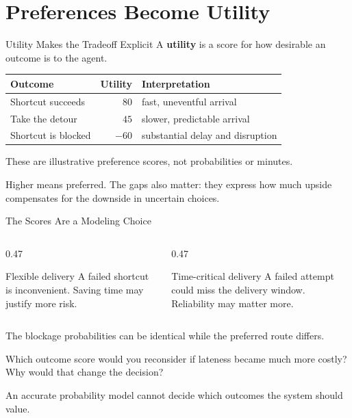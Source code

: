 \documentclass[aspectratio=169,10pt]{beamer}
\begin{document}
\section{Preferences Become Utility}

\begin{frame}{Utility Makes the Tradeoff Explicit}
  A \textbf{utility} is a score for how desirable an outcome is to the agent.
  \begin{center}
    \renewcommand{\arraystretch}{1.5}
    \begin{tabular}{l|r|l}
      \textbf{Outcome} & \textbf{Utility} & \textbf{Interpretation} \\\hline
      Shortcut succeeds & $80$ & fast, uneventful arrival \\
      Take the detour & $45$ & slower, predictable arrival \\
      Shortcut is blocked & $-60$ & substantial delay and disruption
    \end{tabular}
  \end{center}
  These are illustrative preference scores, not probabilities or minutes.
  \begin{keyidea}
    Higher means preferred. The gaps also matter: they express how much upside compensates for the downside in uncertain choices.
  \end{keyidea}
\end{frame}

\begin{frame}{The Scores Are a Modeling Choice}
  \begin{columns}[T,onlytextwidth]
    \begin{column}{0.47\textwidth}
      \begin{block}{Flexible delivery}
        A failed shortcut is inconvenient. Saving time may justify more risk.
      \end{block}
    \end{column}
    \begin{column}{0.47\textwidth}
      \begin{block}{Time-critical delivery}
        A failed attempt could miss the delivery window. Reliability may matter more.
      \end{block}
    \end{column}
  \end{columns}
  The blockage probabilities can be identical while the preferred route differs.
  \begin{activity}
    Which outcome score would you reconsider if lateness became much more costly? Why would that change the decision?
  \end{activity}
  \begin{keyidea}
    An accurate probability model cannot decide which outcomes the system should value.
  \end{keyidea}
\end{frame}
\end{document}
